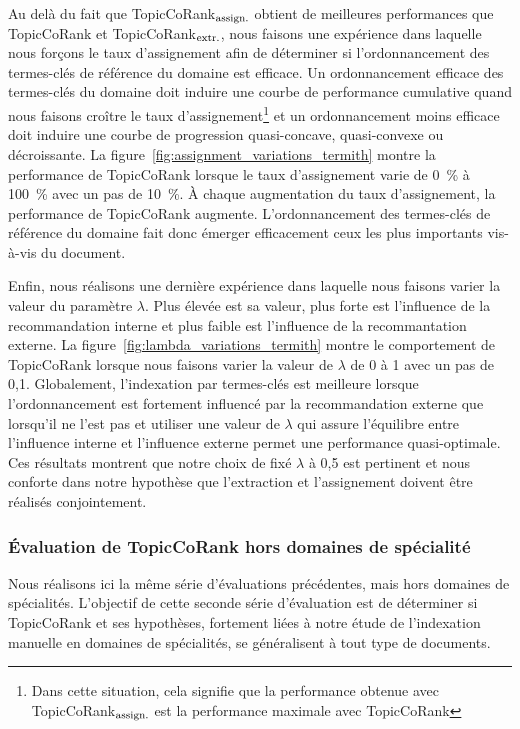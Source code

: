         Au delà du fait que TopicCoRank$_\textnormal{assign.}$ obtient de
        meilleures performances que TopicCoRank et
        TopicCoRank$_\textnormal{extr.}$, nous faisons une expérience dans
        laquelle nous forçons le taux d'assignement afin de déterminer si
        l'ordonnancement des termes-clés de référence du domaine est efficace.
        Un ordonnancement efficace des termes-clés du domaine doit induire une
        courbe de performance cumulative quand nous faisons croître le taux
        d'assignement\footnote{Dans cette situation, cela signifie que la
        performance obtenue avec TopicCoRank$_\textnormal{assign.}$ est la
        performance maximale avec TopicCoRank} et un ordonnancement moins
        efficace doit induire une courbe de progression quasi-concave,
        quasi-convexe ou décroissante. La
        figure~\ref{fig:assignment_variations_termith} montre la performance de
        TopicCoRank lorsque le taux d'assignement varie de 0~\% à 100~\% avec un
        pas de 10~\%. À chaque augmentation du taux d'assignement, la
        performance de TopicCoRank augmente. L'ordonnancement des termes-clés de
        référence du domaine fait donc émerger efficacement ceux les plus
        importants vis-à-vis du document.
        

        Enfin, nous réalisons une dernière expérience dans laquelle nous faisons
        varier la valeur du paramètre $\lambda$. Plus élevée est sa valeur, plus
        forte est l'influence de la recommandation interne et plus faible est
        l'influence de la recommantation externe. La
        figure~\ref{fig:lambda_variations_termith} montre le comportement de
        TopicCoRank lorsque nous faisons varier la valeur de $\lambda$ de 0 à 1
        avec un pas de 0,1. Globalement, l'indexation par termes-clés est
        meilleure lorsque l'ordonnancement est fortement influencé par la
        recommandation externe que lorsqu'il ne l'est pas et utiliser une valeur
        de $\lambda$ qui assure l'équilibre entre l'influence interne et
        l'influence externe permet une performance quasi-optimale. Ces résultats
        montrent que notre choix de fixé $\lambda$ à 0,5 est pertinent et nous
        conforte dans notre hypothèse que l'extraction et l'assignement doivent
        être réalisés conjointement.
        
      
      \subsubsection{Évaluation de TopicCoRank hors domaines de spécialité}
      \label{subsubsec:main-domain_specific_keyphrase_annotation-supervised_automatic_keyphrase_annotation-evaluation-topiccorank_indepent_domains}
        Nous réalisons ici la même série d'évaluations précédentes, mais hors
        domaines de spécialités. L'objectif de cette seconde série d'évaluation
        est de déterminer si TopicCoRank et ses hypothèses, fortement liées à
        notre étude de l'indexation manuelle en domaines de spécialités, se
        généralisent à tout type de documents.

